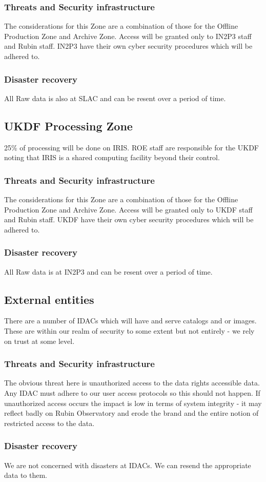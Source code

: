 \subsubsection{Threats and Security infrastructure}
The considerations for this Zone are a combination of those for the Offline Production Zone and \gls{Archive} Zone.
Access will be granted only to \gls{IN2P3} staff and Rubin staff.
IN2P3 have their own cyber security procedures which will be adhered to.
\subsubsection{Disaster recovery}
All Raw data is also at \gls{SLAC} and can be resent over a period of time.

\subsection{UKDF Processing Zone}
25\% of processing will be done on \gls{IRIS}.
\gls{ROE} staff are responsible for the \gls{UKDF} noting that \gls{IRIS} is a shared computing facility beyond their control.

\subsubsection{Threats and Security infrastructure}
The considerations for this Zone are a combination of those for the Offline Production Zone and \gls{Archive} Zone.
Access will be granted only to \gls{UKDF} staff and Rubin staff.
UKDF have their own cyber security procedures which will be adhered to.
\subsubsection{Disaster recovery}
All Raw data is at \gls{IN2P3} and can be resent over a period of time.


\subsection{External entities}
There are a number of \gls{IDAC}s which will have and serve catalogs and or images.
These are within our realm of security to some extent but not entirely - we rely on trust at some level.
\subsubsection{Threats and Security infrastructure}
The obvious threat here is unauthorized access to the data rights accessible data.
Any \gls{IDAC} must adhere to our user access protocols so this should not happen.
If unauthorized access occurs the impact is low in terms of system integrity - it may reflect badly on Rubin Observatory and erode the brand and the entire notion of restricted access to the data.

\subsubsection{Disaster recovery}
We are not concerned with disasters at IDACs.
We can resend the appropriate data to them.
